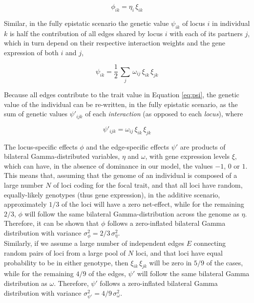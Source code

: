 \documentclass[]{article}
\begin{document}
\begin{equation}
	\phi_{ik} = \eta_i \, \xi_{ik}
	\label{eq:phi}
\end{equation}

Similar, in the fully epistatic scenario the genetic value $\psi_{ik}$ of locus $i$ in individual $k$ is half the contribution of all edges shared by locus $i$ with each of its partners $j$, which in turn depend on their respective interaction weights and the gene expression of both $i$ and $j$,

\begin{equation}
	\psi_{ik} = \frac{1}{2} \, \sum_j \, \omega_{ij} \, \xi_{ik} \, \xi_{jk}
	\label{eq:psi}
\end{equation}

Because all edges contribute to the trait value in Equation \ref{eq:psi}, the genetic value of the individual can be re-written, in the fully epistatic scenario, as the sum of genetic values $\psi'_{ijk}$ of each \textit{interaction} (as opposed to each \textit{locus}), where

\begin{equation}
	\psi'_{ijk} = \omega_{ij} \, \xi_{ik} \, \xi_{jk}
	\label{eq:psiprime}
\end{equation}

The locus-specific effects $\phi$ and the edge-specific effects $\psi'$ are products of bilateral Gamma-distributed variables, $\eta$ and $\omega$, with gene expression levels $\xi$, which can have, in the absence of dominance in our model, the values $-1$, $0$ or $1$. This means that, assuming that the genome of an individual is composed of a large number $N$ of loci coding for the focal trait, and that all loci have random, equally-likely genotypes (thus gene expression), in the additive scenario, approximately $1/3$ of the loci will have a zero net-effect, while for the remaining $2/3$, $\phi$ will follow the same bilateral Gamma-distribution across the genome as $\eta$. Therefore, it can be shown that $\phi$ follows a zero-inflated bilateral Gamma distribution with variance $\sigma_{\phi}^2 = 2/3 \, \sigma_{\eta}^2$.\\

Similarly, if we assume a large number of independent edges $E$ connecting random pairs of loci from a large pool of $N$ loci, and that loci have equal probability to be in either genotype, then $\xi_{ik} \, \xi_{jk}$ will be zero in $5/9$ of the cases, while for the remaining $4/9$ of the edges, $\psi'$ will follow the same bilateral Gamma distribution as $\omega$. Therefore, $\psi'$ follows a zero-inflated bilateral Gamma distribution with variance $\sigma_{\psi'}^2 = 4/9 \, \sigma_{\omega}^2$.\\
\end{document}

